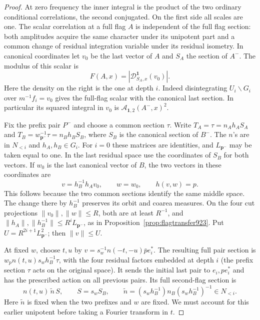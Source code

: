 \documentclass[a4paper,11pt]{article}
\theoremstyle{definition}
\theoremstyle{remark}
\numberwithin{equation}{section}
\begin{document}
\begin{proof}
At zero frequency the inner integral is the product of the
two ordinary conditional correlations, the second conjugated.
On the first side all scales are one. The scalar correlation
at a full flag \(A\) is independent of the full flag section:
both amplitudes acquire the same character under its unipotent
part and a common change of residual integration variable under
its residual isometry. In canonical coordinates let \(v_0\)
be the last vector of \(A\) and \(S_A\) the section of \(A^-\).
The modulus of this scalar is
\[
       F(A,x)=|\mathcal D^{\mathbf1}_{S_A,x}(v_0)|.
\]
Here the density on the right is the one at depth \(i\).
Indeed disintegrating \(U_i\backslash G_i\) over \(m^{-1}f_i=v_0\)
gives the full-flag scalar with the canonical last section.
In particular its squared integral in \(v_0\) is
\(\mathcal A_{\mathbf1,2}(A^-,x)^2\).

Fix the prefix pair \(P^-\) and choose a common section \(\tau\).
Write \(T_A=\tau=n_Ah_A S_A\) and
\(T_B=w_{\mathbf p^-}^{-1}\tau=n_Bh_B S_B\), where \(S_B\)
is the canonical section of \(B^-\). The \(n\)'s are in
\(N_{<i}\) and \(h_A,h_B\in G_i\). For \(i=0\) these matrices
are identities, and \(L_{\mathbf p^-}\) may be taken equal to one.
In the last residual space use the coordinates of \(S_B\) for
both vectors. If \(w_0\) is the last canonical vector of \(B\),
the two vectors in these coordinates are
\[
       v=h_B^{-1}h_A v_0,\qquad w=w_0,\qquad h(v,w)=p.
\]
This follows because the two common sections identify the same
middle space. The change there by \(h_B^{-1}\) preserves its
orbit and coarea measures. On the four cut projections
\(\|v_0\|,\|w\|\le R\), both are at least \(R^{-1}\), and
\(\|h_A\|,\|h_B^{-1}\|\le R^iL_{\mathbf p^-}\), as in
Proposition~\ref{prop:flagtransfer923}. Put
\(U=R^{2i+1}L_{\mathbf p^-}^2\); then \(\|v\|\le U\).

At fixed \(w\), choose \(t,u\) by
\(v=s_w^{-1} n(-t,-u)\bar p e_i^*\). The resulting full pair
section is \(w_p n(t,u)s_w h_B^{-1}\tau\), with the four
residual factors embedded at depth \(i\) (the prefix
section \(\tau\) acts on the original space). It sends the
initial last pair to \(e_i,p e_i^*\) and has the prescribed
action on all previous pairs. Its full second-flag section is
\[
             n(t,u)\,\widetilde n\, S,\qquad
 S=s_w S_B,\qquad
 \widetilde n=(s_w h_B^{-1})n_B(s_w h_B^{-1})^{-1}\in N_{<i}.
\]
Here \(\widetilde n\) is fixed when the two prefixes and \(w\)
are fixed. We must account for this earlier unipotent before
taking a Fourier transform in \(t\).


\end{proof}
\end{document}
